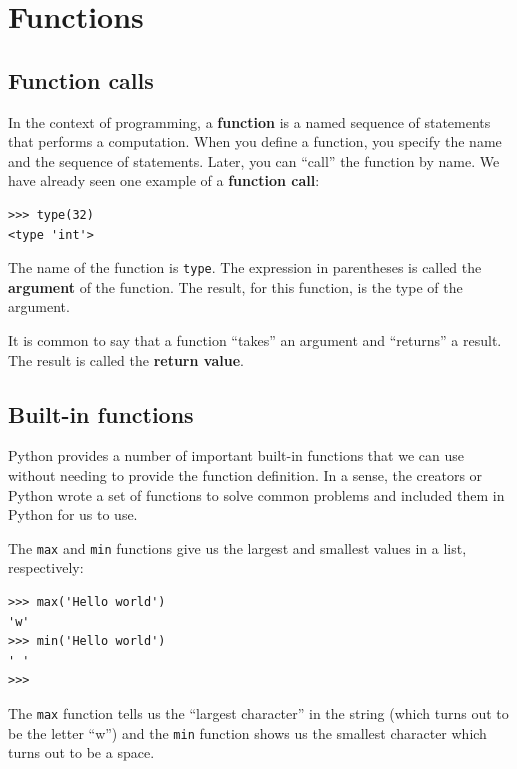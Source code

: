 \documentclass[10pt]{book}
\begin{document}
\chapter{Functions}
\label{funcchap}

\section{Function calls}
\label{functionchap}

In the context of programming, a {\bf function} is a named sequence of
statements that performs a computation.  When you define a function,
you specify the name and the sequence of statements.  Later, you can
``call'' the function by name.  
We have already seen one example of a {\bf function call}:

\beforeverb
\begin{verbatim}
>>> type(32)
<type 'int'>
\end{verbatim}
\afterverb
%
The name of the function is {\tt type}.  The expression in parentheses
is called the {\bf argument} of the function.  The result, for this
function, is the type of the argument.


It is common to say that a function ``takes'' an argument and ``returns''
a result.  The result is called the {\bf return value}.


\section{Built-in functions}

Python provides a number of important built-in functions that
we can use without needing to provide the function definition.
In a sense, the creators or Python wrote a set of functions 
to solve common problems and included them in Python for us to use.

The {\tt max} and {\tt min} functions give us the largest and 
smallest values in a list, respectively:

\beforeverb
\begin{verbatim}
>>> max('Hello world')
'w'
>>> min('Hello world')
' '
>>>
\end{verbatim}
\afterverb
%
The {\tt max} function tells us the ``largest character'' in the 
string (which turns out to be the letter ``w'') and the {\tt min}
function shows us the smallest character which turns out to be a 
space.
\end{document}
